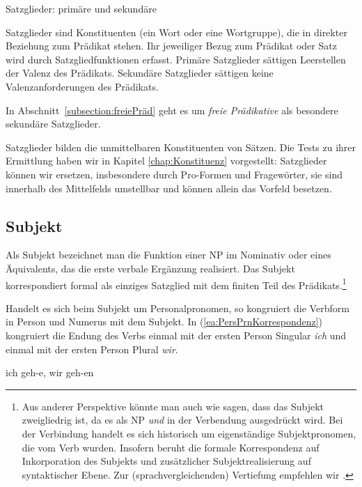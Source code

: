 \begin{Definition}{Satzglieder: primäre und sekundäre}
    
\noindent Satzglieder sind Konstituenten (ein Wort oder eine Wortgruppe), die in direkter Beziehung zum Prädikat stehen. Ihr jeweiliger Bezug zum Prädikat oder Satz wird durch Satzgliedfunktionen erfasst. Primäre Satzglieder sättigen Leerstellen der Valenz des Prädikats. Sekundäre Satzglieder sättigen keine Valenzanforderungen des Prädikats.      
\end{Definition}


In Abschnitt~\ref{subsection:freiePräd} geht es um \textit{freie Prädikative} als besondere sekundäre Satzglieder. 

Satzglieder bilden die unmittelbaren Konstituenten von Sätzen. Die Tests zu ihrer Ermittlung haben wir in Kapitel \ref{chap:Konstituenz} vorgestellt: Satzglieder können wir ersetzen, insbesondere durch Pro-Formen und Fragewörter, sie sind innerhalb des Mittelfelds umstellbar und können allein das Vorfeld besetzen. 



\subsection{Subjekt}\label{subsection:Subjekt}

Als Subjekt bezeichnet man die Funktion einer NP im Nominativ oder eines Äquivalents, das die erste verbale Ergänzung realisiert. Das Subjekt korrespondiert formal als einziges Satzglied mit dem finiten Teil des Prädikats.\footnote{Aus anderer Perspektive könnte man auch wie \citet[95, 126]{Tesniere1980deutsch} sagen, dass das Subjekt zweigliedrig ist, da es als NP \textit{und} in der Verbendung ausgedrückt wird. Bei der Verbindung handelt es sich historisch um eigenständige Subjektpronomen, die vom Verb  wurden. Insofern beruht die formale Korrespondenz auf Inkorporation des Subjekts und zusätzlicher Subjektrealisierung auf syntaktischer Ebene. Zur (sprachvergleichenden) Vertiefung empfehlen wir \citet{Agel1995}.} 

Handelt es sich beim Subjekt um Personalpronomen, so kongruiert die Verbform in Person und Numerus mit dem Subjekt. In (\ref{ea:PersPrnKorrespondenz}) kongruiert die Endung des Verbs einmal mit der ersten Person Singular \textit{ich} und einmal mit der ersten Person Plural \textit{wir}. 

\ea \label{ea:PersPrnKorrespondenz} ich geh-e, wir geh-en 
\z 

